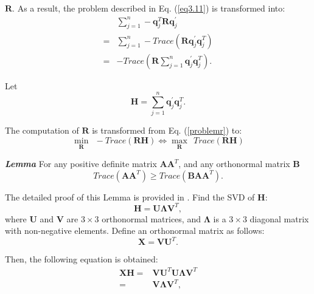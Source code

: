 $\mathbf{R}$. As a result, the problem described in Eq. (\ref{eq3.11}) is transformed into:
\begin{equation}
\begin{aligned}
    &\sum_{j=1}^{n}-\mathbf{q}_{j}^{T}\mathbf{R}\mathbf{q}_{j}^{\prime}\\
    =&\sum_{j=1}^{n}-Trace\left(\mathbf{R}\mathbf{q}_{j}^{\prime}\mathbf{q}_{j}^{T}\right)\\
    =&-Trace\left(\mathbf{R}\sum_{j=1}^{n}\mathbf{q}_{j}^{\prime}\mathbf{q}_{j}^{T} \right).
 \end{aligned}
\end{equation} \par
Let
\begin{equation}
\mathbf{H}=\sum_{j=1}^{n}\mathbf{q}_{j}^{\prime}\mathbf{q}_{j}^{T}.
\end{equation} \par
The computation of $\mathbf{R}$ is transformed from Eq. (\ref{problemr}) to:
\begin{equation}
\underset{\mathbf{R}}{\min } \ \ -Trace\left(\mathbf{R}\mathbf{H} \right) \Leftrightarrow \underset{\mathbf{R}}{\max } \ \ Trace\left(\mathbf{R}\mathbf{H} \right) \label{eq3.14}
\end{equation}\par
\noindent\textbf{\textit{Lemma}} For any positive definite matrix $\mathbf{A}\mathbf{A}^{T}$, and any orthonormal matrix $\mathbf{B}$
\begin{equation}
Trace\left(\mathbf{A}\mathbf{A}^{T} \right) \geq Trace\left(\mathbf{B}\mathbf{A}\mathbf{A}^{T} \right).
\end{equation}\par
The detailed proof of this Lemma is provided in \cite{icp}. Find the SVD of $\mathbf{H}$:
\begin{equation}
\mathbf{H} = \mathbf{U}\mathbf{\Lambda}\mathbf{V}^{T},
\end{equation}
where $\mathbf{U}$ and $\mathbf{V}$ are $3\times3$ orthonormal matrices, and $\mathbf{\Lambda}$ is a $3\times3$
diagonal matrix with non-negative elements.  Define an orthonormal matrix as follows:
\begin{equation}
\mathbf{X} = \mathbf{V}\mathbf{U}^{T}.
\end{equation} \par
Then, the following equation is obtained:
\begin{equation}
\begin{aligned}
\mathbf{X}\mathbf{H} =& \mathbf{V}\mathbf{U}^{T}\mathbf{U}\mathbf{\Lambda}\mathbf{V}^{T} \\
=& \mathbf{V}\mathbf{\Lambda}\mathbf{V}^{T},
\end{aligned}
\end{equation}
